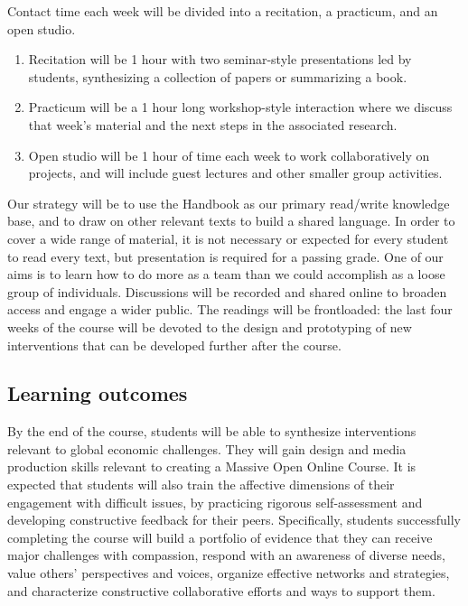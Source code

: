 Contact time each week will be divided into a recitation, a practicum,
and an open studio.

\begin{enumerate}
\def\labelenumi{\arabic{enumi}.}
\tightlist
\item
  Recitation will be 1 hour with two seminar-style presentations led by
  students, synthesizing a collection of papers or summarizing a book.
\item
  Practicum will be a 1 hour long workshop-style interaction where we
  discuss that week's material and the next steps in the associated
  research.
\item
  Open studio will be 1 hour of time each week to work collaboratively
  on projects, and will include guest lectures and other smaller group
  activities.
\end{enumerate}

Our strategy will be to use the Handbook as our primary read/write
knowledge base, and to draw on other relevant texts to build a shared
language. In order to cover a wide range of material, it is not
necessary or expected for every student to read every text, but
presentation is required for a passing grade. One of our aims is to
learn how to do more as a team than we could accomplish as a loose group
of individuals. Discussions will be recorded and shared online to
broaden access and engage a wider public. The readings will be
frontloaded: the last four weeks of the course will be devoted to the
design and prototyping of new interventions that can be developed
further after the course.

\hypertarget{learning-outcomes}{%
\subsection{Learning outcomes}\label{learning-outcomes}}

By the end of the course, students will be able to synthesize
interventions relevant to global economic challenges. They will gain
design and media production skills relevant to creating a Massive Open
Online Course. It is expected that students will also train the
affective dimensions of their engagement with difficult issues, by
practicing rigorous self-assessment and developing constructive feedback
for their peers. Specifically, students successfully completing the
course will build a portfolio of evidence that they can receive major
challenges with compassion, respond with an awareness of diverse needs,
value others' perspectives and voices, organize effective networks and
strategies, and characterize constructive collaborative efforts and ways
to support them.

